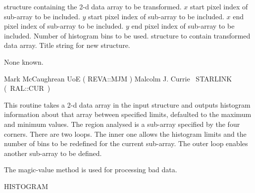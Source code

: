{\begin{manroutinedescription}
\begin{manparametertable}
  {} structure containing the 2-d data array to be
  transformed.
  {$x$} start pixel index of sub-array to be included.
  {$y$} start pixel index of sub-array to be included.
  {$x$} end pixel index of sub-array to be included.
  {$y$} end pixel index of sub-array to be included.
  Number of histogram bins to be used. \mbox{\mantt [2048]}
  {} structure to contain transformed data array.
  Title string for new {} structure. \mbox{}
\end{manparametertable}
  None known.

  Mark McCaughrean UoE ( {\mantt REVA}::{\mantt MJM} )
  Malcolm J. Currie ~STARLINK \mbox{( {\mantt RAL}::{\mantt CUR} )}
\end{manroutinedescription}

\begin{manroutinedescription}
  This routine takes a 2-d data array in the input {} structure
  and outputs histogram information about that array between
  specified limits, defaulted to the maximum and minimum values.
  The region analysed is a sub-array specified by the four corners.
  There are two loops. The inner one allows the histogram limits
  and the number of bins to be redefined for the current sub-array.
  The outer loop enables another sub-array to be defined.

  The magic-value method is used for processing bad data.

  HISTOGRAM


\end{manroutinedescription}}
